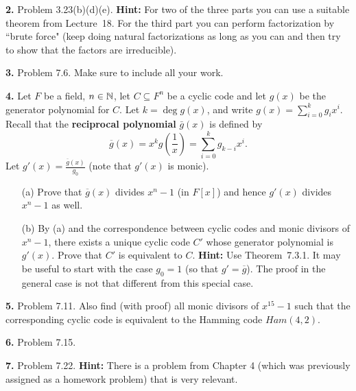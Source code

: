 \documentclass[12pt]{amsart}
\begin{document}
\skv
{\bf 2.} Problem 3.23(b)(d)(e). {\bf Hint:} For two of the three parts you can use a suitable theorem from Lecture~18. For the third part you can perform factorization by ``brute force" (keep doing natural factorizations as long as you can and then try to show that the factors are irreducible).
\skv
\skv

{\bf 3.} Problem 7.6. Make sure to include all your work.
\skv
\skv


{\bf 4.} Let $F$ be a field, $n\in{\mathbb N}$, let $C\subseteq F^n$ be a cyclic code and let $g(x)$ be the generator polynomial for $C$. Let
$k=\deg g(x)$, and write $g(x)=\sum_{i=0}^k g_i x^i$. Recall that the {\bf reciprocal polynomial} $\bar g(x)$ is defined by 
$${\overline g}(x)=x^k g\left(\frac{1}{x}\right)=\sum_{i=0}^k g_{k-i} x^i.$$  
Let $g'(x)=\frac{{\overline g}(x)}{g_0}$ (note that $g'(x)$ is monic).
\begin{itemize}
\item[(a)] Prove that $\overline g(x)$ divides $x^n-1$ (in $F[x]$) and hence $g'(x)$ divides $x^n-1$ as well.
\item[(b)] By (a) and the correspondence between cyclic codes and monic divisors of $x^n-1$, there exists a unique cyclic code $C'$
whose generator polynomial is $g'(x)$. Prove that $C'$ is equivalent to $C$.  {\bf Hint:} Use Theorem~7.3.1. It may be useful to start with the case $g_0=1$ (so that $g'=\overline g$). The proof in the general case is not that different from this special case. 
\end{itemize}
\skv

{\bf 5.} Problem 7.11. Also find (with proof) all monic divisors of $x^{15}-1$ such that the corresponding cyclic code is equivalent to the Hamming code $Ham(4,2)$.
\skv
\skv

{\bf 6.} Problem 7.15.
\skv
\skv


{\bf 7.} Problem 7.22. {\bf Hint:} There is a problem from Chapter 4 (which was previously assigned as a homework problem) that is very relevant.
\end{document}
